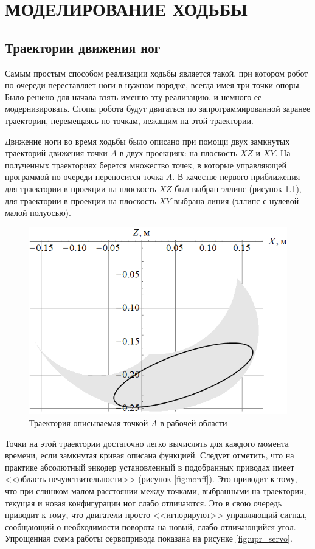\chapter{\MakeUppercase{Моделирование ходьбы}}
\section{Траектории движения ног}

Самым простым способом реализации ходьбы является такой, при котором робот по очереди переставляет ноги в нужном порядке, всегда имея три точки опоры. Было решено для начала взять именно эту реализацию, и немного ее модернизировать. Стопы робота будут двигаться по запрограммированной заранее траектории, перемещаясь по точкам, лежащим на этой траектории.

Движение ноги во время ходьбы было описано при помощи двух замкнутых траекторий движения точки $ A $ в двух проекциях: на плоскость $ XZ $ и $ XY $. На полученных траекториях берется множество точек, в которые управляющей программой по очереди переносится точка $A$. В качестве первого приближения для траектории в проекции на плоскость $ XZ $ был выбран эллипс (рисунок \ref{fig:traj1}), для траектории в проекции на плоскость $ XY $ выбрана линия (эллипс с нулевой малой полуосью).

\begin{figure}[h]
    \centering
    \includegraphics[scale=0.6]{chapter_walking_model/figure8.png}
    \caption{Траектория описываемая точкой $A$ в рабочей области}
    \label{fig:traj1}
\end{figure}

Точки на этой траектории достаточно легко вычислять для каждого момента времени, если замкнутая кривая описана функцией. Следует отметить, что на практике абсолютный энкодер установленный в подобранных приводах имеет <<область нечувствительности>> (рисунок \ref{fig:nonff}). Это приводит к тому, что при слишком малом расстоянии между точками, выбранными на траектории, текущая и новая конфигурации ног слабо отличаются. Это в свою очередь приводит к тому, что двигатели просто <<игнорируют>> управляющий сигнал, сообщающий о необходимости поворота на новый, слабо отличающийся угол. Упрощенная схема работы сервопривода показана на рисунке \ref{fig:upr_servo}.

